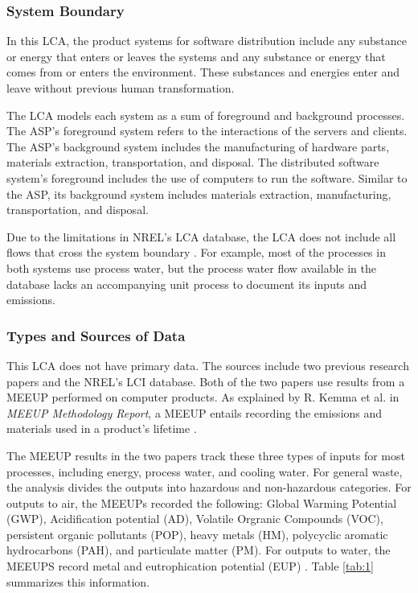 \documentclass[final,journal,10pt,letterpaper,oneside,twocolumn,compsoc]%
{IEEEtran}
\begin{document}
\subsubsection{System Boundary}
In this LCA, the product systems for software distribution
include any substance or energy that enters or
leaves the systems and any substance or energy that comes from or enters the
environment. These substances and energies enter and leave without previous
human transformation.

The LCA models each system as a sum of foreground and background processes. The
ASP's foreground system refers to the interactions of the servers and
clients. The ASP's background system includes the manufacturing
of hardware parts, materials
extraction, transportation, and disposal. The distributed software system's
foreground
includes the use of computers to run the software. Similar to the ASP, its
background
system includes materials extraction, manufacturing, transportation, and
disposal.

Due to the limitations in NREL's LCA database, the LCA does not include all
flows that cross the system boundary \cite{database}. For example, most of the
processes in
both systems use process water, but the process water flow available in the
database lacks an accompanying unit process to document its inputs and
emissions.

\subsubsection{Types and Sources of Data}
This LCA does not have primary data. The sources include two previous research
papers
and the NREL's LCI database. Both of the two papers use results from a
MEEUP performed on
computer products. As explained by R. Kemma et al. in \textit{MEEUP Methodology
Report}, a MEEUP entails recording the emissions and materials used
in a product's lifetime \cite{meeup}.

The MEEUP results in the two papers track these
three types of inputs for most processes, including energy, process
water, and cooling water. For general waste, the analysis divides the outputs
into hazardous and non-hazardous categories. For outputs to air, the MEEUPs
recorded the following: Global Warming Potential (GWP), Acidification
potential (AD), Volatile Orgranic Compounds (VOC), persistent organic
pollutants (POP), heavy
metals (HM), polycyclic aromatic hydrocarbons (PAH), and particulate matter
(PM). For outputs to
water, the MEEUPS record metal and eutrophication potential (EUP) \cite{client}
\cite{desktop}. Table \ref{tab:1} summarizes this information.
\end{document}
